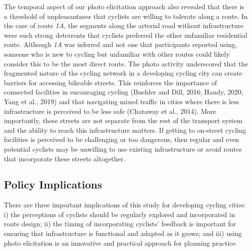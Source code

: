 \documentclass[]{elsarticle} %
\begin{document}
The temporal aspect of our photo elicitation approach also revealed that
there is a threshold of unpleasantness that cyclists are willing to
tolerate along a route. In the case of route \emph{1A}, the segments
along the arterial road without infrastructure were such strong
deterrents that cyclists preferred the other unfamiliar residential
route. Although \emph{1A} was inferred and not one that participants
reported using, someone who is new to cycling but unfamiliar with other
routes could likely consider this to be the most direct route. The photo
activity underscored that the fragmented nature of the cycling network
in a developing cycling city can create barriers for accessing bikeable
streets. This reinforces the importance of connected facilities in
encouraging cycling (Buehler and Dill, 2016; Handy, 2020; Yang et al.,
2019) and that navigating mixed traffic in cities where there is less
infrastructure is perceived to be less safe (Chataway et al., 2014).
More importantly, these streets are not separate from the rest of the
transport system and the ability to reach this infrastructure matters.
If getting to on-street cycling facilities is perceived to be
challenging or too dangerous, then regular and even potential cyclists
may be unwilling to use existing infrastructure or avoid routes that
incorporate these streets altogether.

\hypertarget{policy-implications}{%
\subsection{Policy Implications}\label{policy-implications}}

There are three important implications of this study for developing
cycling cities: i) the perceptions of cyclists should be regularly
explored and incorporated in route design; ii) the timing of
incorporating cyclists' feedback is important for ensuring that
infrastructure is functional and adapted as it grows; and iii) using
photo elicitation is an innovative and practical approach for planning
practice.
\end{document}
